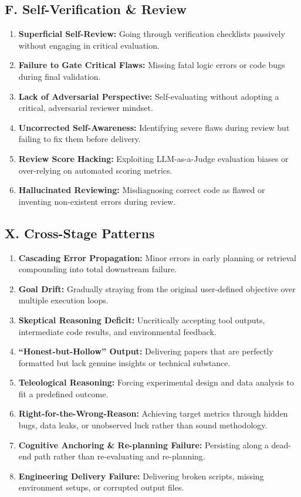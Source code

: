 \subsection*{F. Self-Verification \& Review}
\begin{enumerate}[label=\textbf{F.\arabic*}, leftmargin=2.8em, labelsep=0.6em, itemsep=3pt, parsep=0pt]
    \item \textbf{Superficial Self-Review:} Going through verification checklists passively without engaging in critical evaluation.
    \item \textbf{Failure to Gate Critical Flaws:} Missing fatal logic errors or code bugs during final validation.
    \item \textbf{Lack of Adversarial Perspective:} Self-evaluating without adopting a critical, adversarial reviewer mindset.
    \item \textbf{Uncorrected Self-Awareness:} Identifying severe flaws during review but failing to fix them before delivery.
    \item \textbf{Review Score Hacking:} Exploiting LLM-as-a-Judge evaluation biases or over-relying on automated scoring metrics.
    \item \textbf{Hallucinated Reviewing:} Misdiagnosing correct code as flawed or inventing non-existent errors during review.
\end{enumerate}
 
\subsection*{X. Cross-Stage Patterns}
\begin{enumerate}[label=\textbf{X.\arabic*}, leftmargin=2.8em, labelsep=0.6em, itemsep=3pt, parsep=0pt]
    \item \textbf{Cascading Error Propagation:} Minor errors in early planning or retrieval compounding into total downstream failure.
    \item \textbf{Goal Drift:} Gradually straying from the original user-defined objective over multiple execution loops.
    \item \textbf{Skeptical Reasoning Deficit:} Uncritically accepting tool outputs, intermediate code results, and environmental feedback.
    \item \textbf{``Honest-but-Hollow'' Output:} Delivering papers that are perfectly formatted but lack genuine insights or technical substance.
    \item \textbf{Teleological Reasoning:} Forcing experimental design and data analysis to fit a predefined outcome.
    \item \textbf{Right-for-the-Wrong-Reason:} Achieving target metrics through hidden bugs, data leaks, or unobserved luck rather than sound methodology.
    \item \textbf{Cognitive Anchoring \& Re-planning Failure:} Persisting along a dead-end path rather than re-evaluating and re-planning.
    \item \textbf{Engineering Delivery Failure:} Delivering broken scripts, missing environment setups, or corrupted output files.
\end{enumerate}

